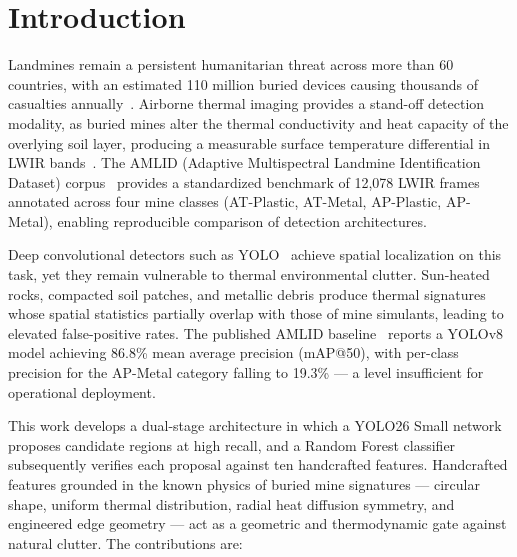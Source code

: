 \documentclass[conference]{IEEEtran}
\begin{document}
\section{Introduction}

Landmines remain a persistent humanitarian threat across more than 60 countries, with an estimated 110 million buried devices causing thousands of casualties annually~\cite{icbl2024}. Airborne thermal imaging provides a stand-off detection modality, as buried mines alter the thermal conductivity and heat capacity of the overlying soil layer, producing a measurable surface temperature differential in LWIR bands~\cite{mcfee1999,lopez2004,cremer2002}. The AMLID (Adaptive Multispectral Landmine Identification Dataset) corpus~\cite{gallagher2025} provides a standardized benchmark of 12,078 LWIR frames annotated across four mine classes (AT-Plastic, AT-Metal, AP-Plastic, AP-Metal), enabling reproducible comparison of detection architectures.

Deep convolutional detectors such as YOLO~\cite{redmon2016} achieve spatial localization on this task, yet they remain vulnerable to thermal environmental clutter. Sun-heated rocks, compacted soil patches, and metallic debris produce thermal signatures whose spatial statistics partially overlap with those of mine simulants, leading to elevated false-positive rates. The published AMLID baseline~\cite{gallagher2025} reports a YOLOv8~\cite{jocher2023yolov8} model achieving 86.8\% mean average precision (mAP@50), with per-class precision for the AP-Metal category falling to 19.3\% --- a level insufficient for operational deployment.

This work develops a dual-stage architecture in which a YOLO26 Small network proposes candidate regions at high recall, and a Random Forest classifier subsequently verifies each proposal against ten handcrafted features. Handcrafted features grounded in the known physics of buried mine signatures --- circular shape, uniform thermal distribution, radial heat diffusion symmetry, and engineered edge geometry --- act as a geometric and thermodynamic gate against natural clutter. The contributions are:
\end{document}
